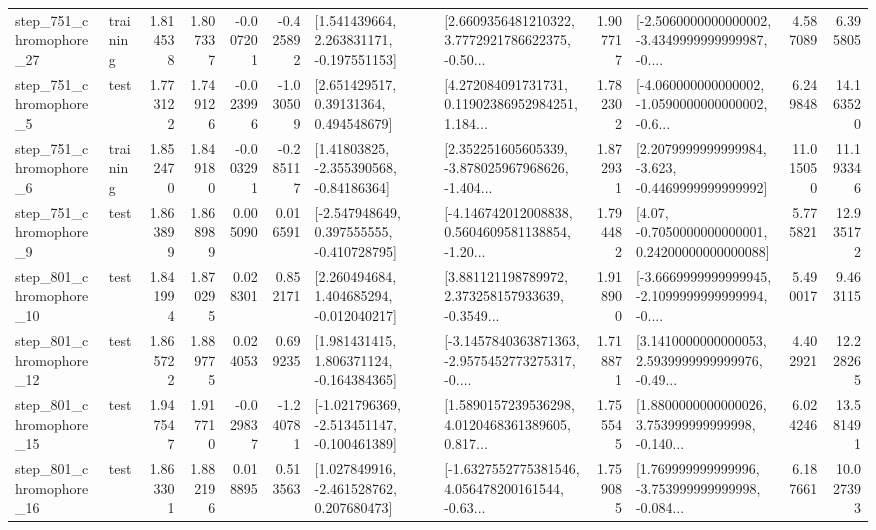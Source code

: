 \begin{tabular}{llrrrrllrlrr}
  step\_751\_chromophore\_27 &  training &      1.814538 &    1.807337 &     -0.007201 & -0.425892 &    [1.541439664, 2.263831171, -0.197551153] &  [2.6609356481210322, 3.7772921786622375, -0.50... &       1.907717 &  [-2.5060000000000002, -3.4349999999999987, -0.... &            4.587089 &          6.395805 \\
   step\_751\_chromophore\_5 &      test &      1.773122 &    1.749126 &     -0.023996 & -1.030509 &      [2.651429517, 0.39131364, 0.494548679] &  [4.272084091731731, 0.11902386952984251, 1.184... &       1.782302 &  [-4.060000000000002, -1.0590000000000002, -0.6... &            6.249848 &         14.163520 \\
   step\_751\_chromophore\_6 &  training &      1.852470 &    1.849180 &     -0.003291 & -0.285117 &     [1.41803825, -2.355390568, -0.84186364] &  [2.352251605605339, -3.878025967968626, -1.404... &       1.872931 &  [2.2079999999999984, -3.623, -0.4469999999999992] &           11.015050 &         11.193346 \\
   step\_751\_chromophore\_9 &      test &      1.863899 &    1.868989 &      0.005090 &  0.016591 &   [-2.547948649, 0.397555555, -0.410728795] &  [-4.146742012008838, 0.5604609581138854, -1.20... &       1.794482 &   [4.07, -0.7050000000000001, 0.24200000000000088] &            5.775821 &         12.935172 \\
  step\_801\_chromophore\_10 &      test &      1.841994 &    1.870295 &      0.028301 &  0.852171 &    [2.260494684, 1.404685294, -0.012040217] &  [3.881121198789972, 2.373258157933639, -0.3549... &       1.918900 &  [-3.6669999999999945, -2.1099999999999994, -0.... &            5.490017 &          9.463115 \\
  step\_801\_chromophore\_12 &      test &      1.865722 &    1.889775 &      0.024053 &  0.699235 &    [1.981431415, 1.806371124, -0.164384365] &  [-3.1457840363871363, -2.9575452773275317, -0.... &       1.718871 &  [3.1410000000000053, 2.5939999999999976, -0.49... &            4.402921 &         12.228265 \\
  step\_801\_chromophore\_15 &      test &      1.947547 &    1.917710 &     -0.029837 & -1.240781 &  [-1.021796369, -2.513451147, -0.100461389] &  [1.5890157239536298, 4.0120468361389605, 0.817... &       1.755545 &  [1.8800000000000026, 3.753999999999998, -0.140... &            6.024246 &         13.581491 \\
  step\_801\_chromophore\_16 &      test &      1.863301 &    1.882196 &      0.018895 &  0.513563 &    [1.027849916, -2.461528762, 0.207680473] &  [-1.6327552775381546, 4.056478200161544, -0.63... &       1.759085 &  [1.769999999999996, -3.753999999999998, -0.084... &            6.187661 &         10.027393 \\

\end{tabular}
